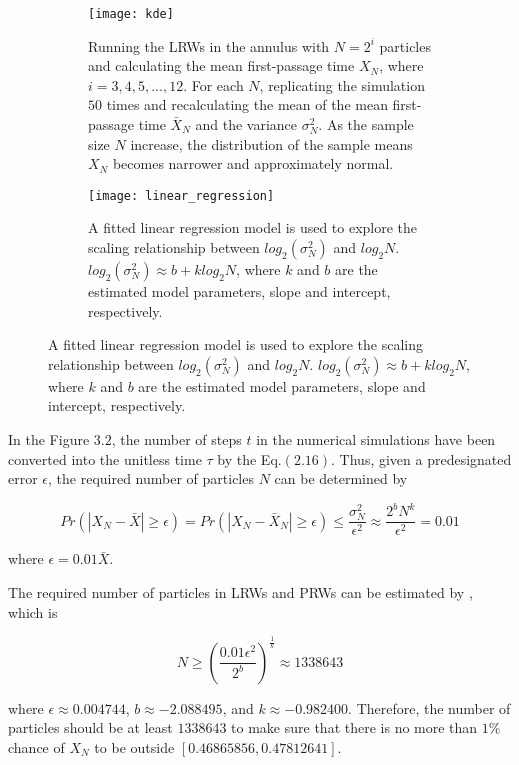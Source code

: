 \begin{figure}
  \begin{subfigure}{0.9\textwidth}
    \centering
    \texttt{[image: kde]}
    \caption{Running the LRWs in the annulus with $N = 2^i$
      particles and calculating the mean first-passage time $X_N$, where
      $i=3, 4, 5, ..., 12$. For each $N$, replicating the simulation
      $50$ times and recalculating the mean of the mean first-passage
      time $\bar X_{N}$ and the variance $\sigma^2_{N}$. As the sample
      size $N$ increase, the distribution of the sample means $X_N$
      becomes narrower and approximately normal.}
  \end{subfigure}
  \begin{subfigure}{0.9\textwidth}
    \centering
    \texttt{[image: linear\_regression]}
    \caption{A fitted linear regression model is used to explore the
      scaling relationship between $log_{2} (\sigma^2_{N})$ and
      $log_{2} N$. $log_{2} (\sigma^2_{N}) \approx b + k log_{2} N$,
      where $k$ and $b$ are the estimated model parameters, slope and
      intercept, respectively.}
  \end{subfigure}
\end{figure}

In the Figure $3.2$, the number of steps $t$ in the numerical
simulations have been converted into the unitless time $\tau$ by the
Eq.$(2.16)$. Thus, given a predesignated error $\epsilon$, the
required number of particles $N$ can be determined by

\begin{equation}
  Pr(|X_{N} - \bar X| \geq \epsilon) = Pr(|X_{N} - \bar X_{N}| \geq
  \epsilon) \leq \frac{\sigma^2_{N}}{\epsilon^2} \approx \frac{2^b
    N^k}{\epsilon^2} = 0.01
\end{equation}

where $\epsilon = 0.01 \bar X$.

The required number of particles in LRWs and PRWs can be estimated by
, which is

\begin{equation}
  N \geq (\frac{0.01 \epsilon^2}{2^b})^{\frac{1}{k}} \approx 1338643
\end{equation}

where $\epsilon \approx 0.004744$, $b \approx -2.088495$, and $k
\approx -0.982400$. Therefore, the number of particles should be at
least $1338643$ to make sure that there is no more than $1\%$ chance
of $X_N$ to be outside $[0.46865856, 0.47812641]$.


